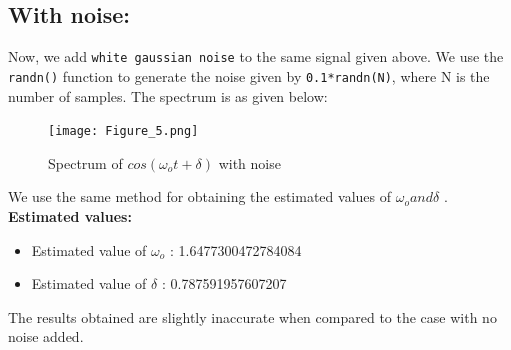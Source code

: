 \documentclass[11pt, a4paper]{article}
\begin{document}
\subsection{With noise:}
Now, we add \texttt{white gaussian noise} to the same signal given above. We use the \texttt{randn()} function to generate the noise given by \texttt{0.1*randn(N)}, where N is the number of samples. The spectrum is as given below:
            \begin{figure}[H]
            \centering
            \texttt{[image: Figure\_5.png]}
            \caption{Spectrum of $cos(\omega_o t + \delta)$  with noise}
            \label{fig:Fig6}
        \end{figure}
    We use the same method for obtaining the estimated values of $\omega_o and \delta$ .
        \textbf{Estimated values:}
    \begin{itemize}
        \item Estimated value of $\omega_o$ : 1.6477300472784084
        \item Estimated value of $\delta$   : 0.787591957607207
    \end{itemize}
    The results obtained are slightly inaccurate when compared to the case with no noise added. 
\end{document}
